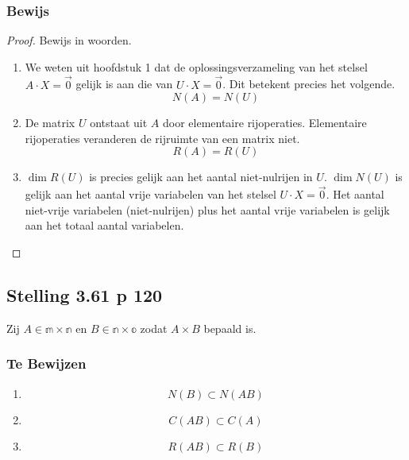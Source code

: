 \documentclass[lineaire_algebra_oplossingen.tex]{subfiles}
\begin{document}
\subsubsection*{Bewijs}
\begin{proof}
Bewijs in woorden.
\begin{enumerate}
\item We weten uit hoofdstuk 1 dat de oplossingsverzameling van het stelsel $A\cdot X = \vec{0}$ gelijk is aan die van $U\cdot X = \vec{0}$.
Dit betekent precies het volgende.
\[
N(A) = N(U)
\]
\item De matrix $U$ ontstaat uit $A$ door elementaire rijoperaties. Elementaire rijoperaties veranderen de rijruimte van een matrix niet. 
\[
R(A) = R(U)
\]
\item
$\dim R(U)$ is precies gelijk aan het aantal niet-nulrijen in $U$.
$\dim N(U)$ is gelijk aan het aantal vrije variabelen van het stelsel $U\cdot X = \vec{0}$. Het aantal niet-vrije variabelen (niet-nulrijen) plus het aantal vrije variabelen is gelijk aan het totaal aantal variabelen.
\end{enumerate}
\end{proof}


\subsection{Stelling 3.61 p 120}
\label{3.61}
Zij $A \in \mathbb{m \times n}$ en $B \in \mathbb{n \times o}$ zodat $A\times B$ bepaald is.

\subsubsection*{Te Bewijzen}
\begin{enumerate}
\item
\[
N(B) \subset N(AB)
\]
\item
\[
C(AB) \subset C(A)
\]
\item
\[ 
R(AB)\subset R(B)
\]
\end{enumerate}
\end{document}
